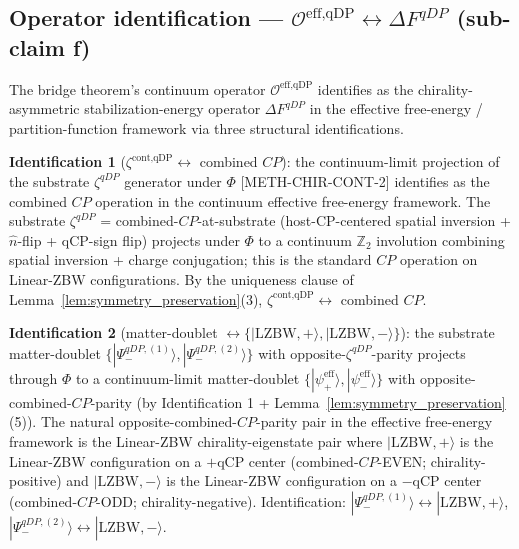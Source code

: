 \documentclass[11pt,letterpaper]{article}
\newcommand{\OeffqDP}{\mathcal{O}^{\text{eff,qDP}}}
\newcommand{\DeltaFqDP}{\Delta F^{qDP}}
\newcommand{\methref}[1]{\textsf{\small[\textsc{#1}]}}
\begin{document}
\subsection{Operator identification --- $\OeffqDP \leftrightarrow \DeltaFqDP$ (sub-claim f)}
\label{sec:operator_id_sector_b}

The bridge theorem's continuum operator $\OeffqDP$ identifies as the chirality-asymmetric stabilization-energy operator $\DeltaFqDP$ in the effective free-energy / partition-function framework via three structural identifications.

\textbf{Identification 1} ($\zeta^{\text{cont,qDP}} \leftrightarrow$ combined $CP$): the continuum-limit projection of the substrate $\zeta^{qDP}$ generator under $\Phi$ \methref{METH-CHIR-CONT-2} identifies as the combined $CP$ operation in the continuum effective free-energy framework. The substrate $\zeta^{qDP}$ = combined-$CP$-at-substrate (host-CP-centered spatial inversion + $\hat{n}$-flip + qCP-sign flip) projects under $\Phi$ to a continuum $\mathbb{Z}_2$ involution combining spatial inversion + charge conjugation; this is the standard $CP$ operation on Linear-ZBW configurations. By the uniqueness clause of Lemma~\ref{lem:symmetry_preservation}(3), $\zeta^{\text{cont,qDP}} \leftrightarrow$ combined $CP$.

\textbf{Identification 2} (matter-doublet $\leftrightarrow \{|\text{LZBW},+\rangle, |\text{LZBW},-\rangle\}$): the substrate matter-doublet $\{|\Psi_-^{qDP,(1)}\rangle, |\Psi_-^{qDP,(2)}\rangle\}$ with opposite-$\zeta^{qDP}$-parity projects through $\Phi$ to a continuum-limit matter-doublet $\{|\psi^{\text{eff}}_+\rangle, |\psi^{\text{eff}}_-\rangle\}$ with opposite-combined-$CP$-parity (by Identification 1 + Lemma~\ref{lem:symmetry_preservation}(5)). The natural opposite-combined-$CP$-parity pair in the effective free-energy framework is the Linear-ZBW chirality-eigenstate pair where $|\text{LZBW},+\rangle$ is the Linear-ZBW configuration on a $+$qCP center (combined-$CP$-EVEN; chirality-positive) and $|\text{LZBW},-\rangle$ is the Linear-ZBW configuration on a $-$qCP center (combined-$CP$-ODD; chirality-negative). Identification: $|\Psi_-^{qDP,(1)}\rangle \leftrightarrow |\text{LZBW},+\rangle$, $|\Psi_-^{qDP,(2)}\rangle \leftrightarrow |\text{LZBW},-\rangle$.
\end{document}
